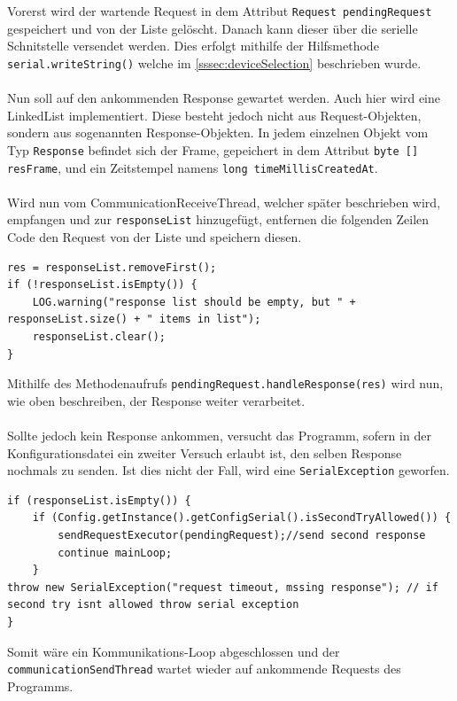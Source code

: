 Vorerst wird der wartende Request in dem Attribut \lstinline[style=java]{Request pendingRequest} gespeichert und von der Liste gelöscht.
Danach kann dieser über die serielle Schnitstelle versendet werden.
Dies erfolgt mithilfe der Hilfsmethode \lstinline[style=java]{serial.writeString()} welche im \autoref{sssec:deviceSelection} beschrieben wurde.\\\\
Nun soll auf den ankommenden Response gewartet werden.
Auch hier wird eine LinkedList implementiert.
Diese besteht jedoch nicht aus Request-Objekten, sondern aus sogenannten Response-Objekten.
In jedem einzelnen Objekt vom Typ \lstinline[style=java]{Response} befindet sich der Frame, gepeichert in dem Attribut \lstinline[style=java]{byte [] resFrame}, und ein Zeitstempel namens \lstinline[style=java]{long timeMillisCreatedAt}.\\\\
Wird nun vom CommunicationReceiveThread, welcher später beschrieben wird, empfangen und zur \lstinline[style=java]{responseList} hinzugefügt, entfernen die folgenden Zeilen Code den Request von der Liste und speichern diesen.
\begin{lstlisting}[style=java,caption=Java-Codebeispiel,label=commThreadSend]
res = responseList.removeFirst();
if (!responseList.isEmpty()) {
    LOG.warning("response list should be empty, but " + responseList.size() + " items in list");
    responseList.clear();
}
\end{lstlisting}
Mithilfe des Methodenaufrufs \lstinline[style=java]{pendingRequest.handleResponse(res)} wird nun, wie oben beschreiben, der Response weiter verarbeitet.\\\\
Sollte jedoch kein Response ankommen, versucht das Programm, sofern in der Konfigurationsdatei ein zweiter Versuch erlaubt ist, den selben Response nochmals zu senden.
Ist dies nicht der Fall, wird eine \lstinline[style=java]{SerialException} geworfen.
\begin{lstlisting}[style=java,caption=Java-Codebeispiel,label=commThreadSend]
if (responseList.isEmpty()) {
    if (Config.getInstance().getConfigSerial().isSecondTryAllowed()) {
        sendRequestExecutor(pendingRequest);//send second response
        continue mainLoop;
    }
throw new SerialException("request timeout, mssing response"); // if second try isnt allowed throw serial exception
}
\end{lstlisting}
Somit wäre ein Kommunikations-Loop abgeschlossen und der \lstinline[style=java]{communicationSendThread} wartet wieder auf ankommende Requests des Programms.\\\\
